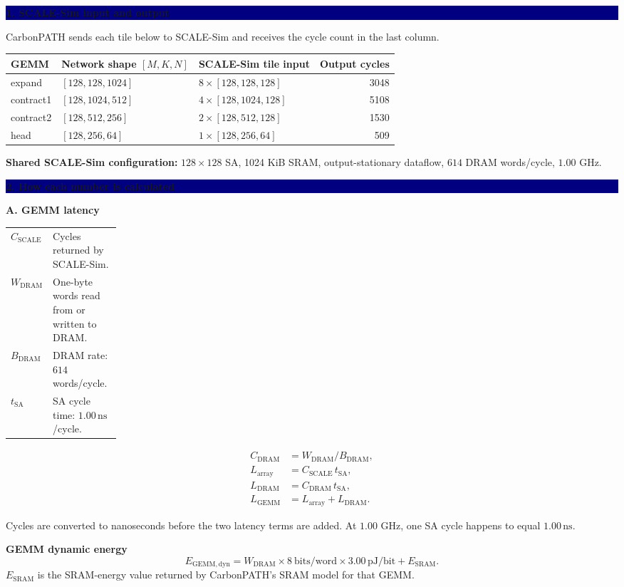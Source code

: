 \documentclass[10pt]{article}
\newcommand{\ns}{\,\mathrm{ns}}
\newcommand{\pj}{\,\mathrm{pJ}}
\newcommand{\sectionbar}[1]{\vspace{0.5em}\noindent
  \colorbox{navy}{\parbox{\dimexpr\linewidth-2\fboxsep\relax}{
  \color{white}\large\bfseries #1}}\par\vspace{0.35em}}
\begin{document}
\newpage
\sectionbar{1. SCALE-Sim input and output}
CarbonPATH sends each tile below to SCALE-Sim and receives the cycle count in
the last column.\par\smallskip
\begin{tabularx}{\linewidth}{@{}l l Y r@{}}
\toprule
\textbf{GEMM} & \textbf{Network shape $[M,K,N]$} & \textbf{SCALE-Sim tile input} & \textbf{Output cycles} \\
\midrule
expand & $[128,128,1024]$ & $8\times[128,128,128]$ & 3048 \\
contract1 & $[128,1024,512]$ & $4\times[128,1024,128]$ & 5108 \\
contract2 & $[128,512,256]$ & $2\times[128,512,128]$ & 1530 \\
head & $[128,256,64]$ & $1\times[128,256,64]$ & 509 \\
\bottomrule
\end{tabularx}
\textbf{Shared SCALE-Sim configuration:} $128\times128$ SA, 1024 KiB SRAM,
output-stationary dataflow, $614$ DRAM words/cycle, $1.00$ GHz.

\sectionbar{2. How each number is calculated}

\textbf{A. GEMM latency}

\begin{tabularx}{\linewidth}{@{}p{0.18\linewidth}Y@{}}
$C_{\mathrm{SCALE}}$ & Cycles returned by SCALE-Sim. \\
$W_{\mathrm{DRAM}}$ & One-byte words read from or written to DRAM. \\
$B_{\mathrm{DRAM}}$ & DRAM rate: $614$ words/cycle. \\
$t_{\mathrm{SA}}$ & SA cycle time: $1.00\ns$/cycle. \\
\end{tabularx}

\begin{align*}
C_{\mathrm{DRAM}} &= W_{\mathrm{DRAM}}/B_{\mathrm{DRAM}},\\
L_{\mathrm{array}} &= C_{\mathrm{SCALE}}\,t_{\mathrm{SA}},\\
L_{\mathrm{DRAM}} &= C_{\mathrm{DRAM}}\,t_{\mathrm{SA}},\\
L_{\mathrm{GEMM}} &= L_{\mathrm{array}}+L_{\mathrm{DRAM}}.
\end{align*}

Cycles are converted to nanoseconds before the two latency terms are added.
At $1.00$ GHz, one SA cycle happens to equal $1.00\ns$.

\textbf{GEMM dynamic energy}
\[
E_{\mathrm{GEMM,dyn}}
=W_{\mathrm{DRAM}}\times8\ \mathrm{bits/word}\times3.00\pj/\mathrm{bit}
+E_{\mathrm{SRAM}}.
\]
$E_{\mathrm{SRAM}}$ is the SRAM-energy value returned by CarbonPATH's SRAM
model for that GEMM.
\end{document}
